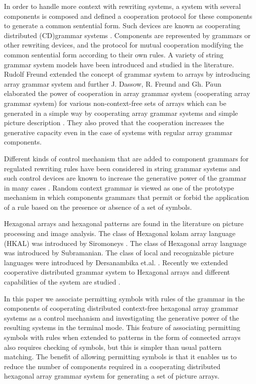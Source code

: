 \documentclass[11pt]{article}
\begin{document}
In order to handle more context with rewriting systems, a system
with several components is composed and defined a cooperation
protocol for these components to generate a common sentential
form. Such devices are known as cooperating distributed
(CD)grammar systems \cite{3}. Components are represented by
grammars or other rewriting devices, and the protocol for mutual
cooperation modifying the common sentential form  according to
their own rules. A variety of string grammar system models
\cite{3} have been introduced and studied in the literature.
Rudolf Freund extended the concept of grammar system to arrays
\cite{2} by introducing array grammar system and further J.
Dassow, R. Freund and Gh. P$\breve{a}$un elaborated the power of
cooperation in array grammar system  (cooperating array grammar
system) for various non-context-free sets of arrays which can be
generated in a simple way by cooperating array grammar systems and
simple picture description \cite{1}. They also proved that the
cooperation increases the generative capacity even in the case of
systems with regular array grammar components.

Different kinds of control mechanism that are added to component
grammars for regulated rewriting rules have been considered in
string grammar systems and such control devices are known to
increase the generative power of the grammar in many cases
\cite{1}. Random context grammar is viewed as one of the prototype
mechanism in which components grammars that permit or forbid the
application of a rule based on  the presence or absence of a set
of symbols.

Hexagonal arrays and hexagonal patterns are found in the
literature on picture processing and image analysis. The class of
Hexagonal kolam array language (HKAL) was introduced by Siromoneys
\cite{9}. The class of Hexagonal array language was introduced by
Subramanian. The class of local and recognizable picture languages
were introduced  by Dersanambika et.al. \cite{6}. Recently we
extended cooperative distributed grammar system to Hexagonal
arrays and different capabilities of the system are studied
\cite{8}.

In this paper we associate permitting symbols with rules of the
grammar in the components of cooperating distributed context-free
hexagonal array grammar systems as a control mechanism and
investigating the generative power of the resulting systems in the
terminal mode. This feature of associating permitting symbols with
rules when extended to patterns in the form of connected arrays
also requires checking of symbols, but this is simpler than usual
pattern matching. The benefit of allowing permitting symbols is
that it enables us to reduce the number of components required in
a cooperating distributed hexagonal array grammar system for
generating a set of picture arrays.
\end{document}
